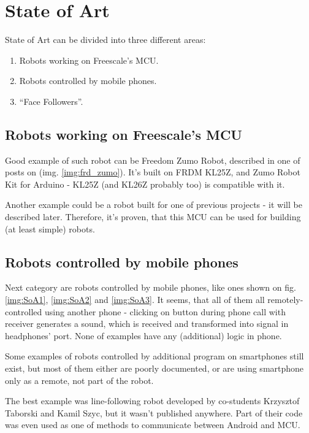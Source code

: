 \documentclass[]{mgr} %
\begin{document}
\section{State of Art}
State of Art can be divided into three different areas:
\begin{enumerate}
  \item Robots working on Freescale's MCU.
  \item Robots controlled by mobile phones.
  \item ``Face Followers''.
\end{enumerate}

\subsection{Robots working on Freescale's MCU}
Good example of such robot can be Freedom Zumo Robot, described in one of posts
on \cite{mcu_on_eclipse} (img. \ref{img:frd_zumo}). It's built on FRDM KL25Z,
and Zumo Robot Kit for Arduino - KL25Z (and KL26Z probably too) is compatible with
it.

Another example could be a robot built for one of previous projects - it will be
described later. Therefore, it's proven, that this MCU can be used for building
(at least simple) robots.

\subsection{Robots controlled by mobile phones}
Next category are robots controlled by mobile phones, like ones shown on fig.
\ref{img:SoA1}, \ref{img:SoA2} and \ref{img:SoA3}. It seems, that all of them
all remotely-controlled using another phone - clicking on button during phone
call with receiver generates a sound, which is received and transformed into
signal in headphones' port. None of examples have any (additional) logic in
phone. 

Some examples of robots controlled by additional program on smartphones
still exist, but most of them either are poorly documented, or are using
smartphone only as a remote, not part of the robot. 

The best example was line-following robot developed by co-students Krzysztof
Taborski and Kamil Szyc, but it wasn't published anywhere. Part of their code
was even used as one of methods to communicate between Android and MCU.

\end{document}
